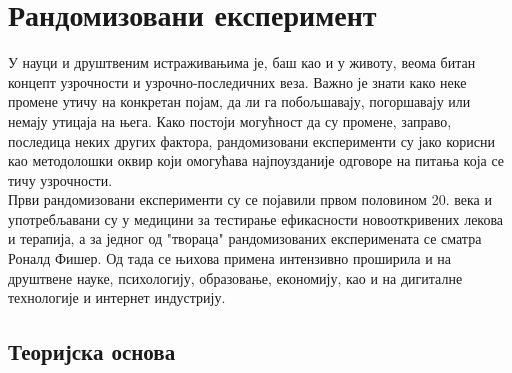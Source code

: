 \documentclass[12pt, a4paper]{article}
\begin{document}



\section{Рандомизовани експеримент}

У науци и друштвеним истраживањима је, баш као и у животу, веома битан концепт узрочности и 
узрочно-последичних веза. Важно је знати како неке промене утичу на конкретан појам, да ли га 
побољшавају, погоршавају или немају утицаја на њега. Како постоји могућност да су промене, 
заправо, последица неких других фактора, рандомизовани експерименти су јако корисни као 
методолошки оквир који омогућава најпоузданије одговоре на питања која се тичу узрочности.\\
Први рандомизовани експерименти су се појавили првом половином 20. века и употребљавани су у 
медицини за тестирање ефикасности новооткривених лекова и терапија, а за једног од "твораца" рандомизованих експеримената се сматра Роналд Фишер. Од тада се њихова примена интензивно 
проширила и на друштвене науке, психологију, образовање, економију, као и на дигиталне технологије 
и интернет индустрију.

\subsection{Теоријска основа}
\end{document}

